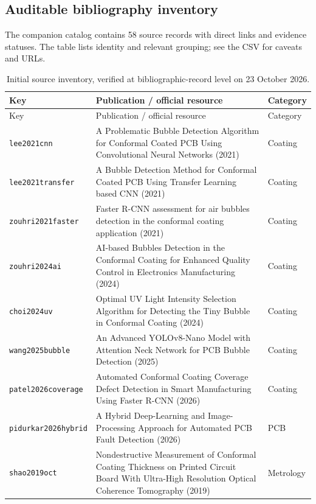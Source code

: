 \subsection{Auditable bibliography inventory}
The companion catalog contains 58 source records with direct links and evidence statuses. The table lists identity and relevant grouping; see the CSV for caveats and URLs.
\begingroup
\footnotesize
\setlength{\LTleft}{0pt}
\setlength{\LTright}{0pt}
\renewcommand{\arraystretch}{1.08}
\begin{longtable}{>{\raggedright\arraybackslash}p{}>{\raggedright\arraybackslash}p{}>{\raggedright\arraybackslash}p{}}
\caption{Initial source inventory, verified at bibliographic-record level on 23 October 2026.}\\
\toprule Key & Publication / official resource & Category \\ \midrule
\endfirsthead
\toprule Key & Publication / official resource & Category \\ \midrule
\endhead
\texttt{lee2021cnn} & A Problematic Bubble Detection Algorithm for Conformal Coated PCB Using Convolutional Neural Networks (2021) & Coating \\
\texttt{lee2021transfer} & A Bubble Detection Method for Conformal Coated PCB Using Transfer Learning based CNN (2021) & Coating \\
\texttt{zouhri2021faster} & Faster R-CNN assessment for air bubbles detection in the conformal coating application (2021) & Coating \\
\texttt{zouhri2024ai} & AI-based Bubbles Detection in the Conformal Coating for Enhanced Quality Control in Electronics Manufacturing (2024) & Coating \\
\texttt{choi2024uv} & Optimal UV Light Intensity Selection Algorithm for Detecting the Tiny Bubble in Conformal Coating (2024) & Coating \\
\texttt{wang2025bubble} & An Advanced YOLOv8-Nano Model with Attention Neck Network for PCB Bubble Detection (2025) & Coating \\
\texttt{patel2026coverage} & Automated Conformal Coating Coverage Defect Detection in Smart Manufacturing Using Faster R-CNN (2026) & Coating \\
\texttt{pidurkar2026hybrid} & A Hybrid Deep-Learning and Image-Processing Approach for Automated PCB Fault Detection (2026) & PCB \\
\texttt{shao2019oct} & Nondestructive Measurement of Conformal Coating Thickness on Printed Circuit Board With Ultra-High Resolution Optical Coherence Tomography (2019) & Metrology \\

\end{longtable}
